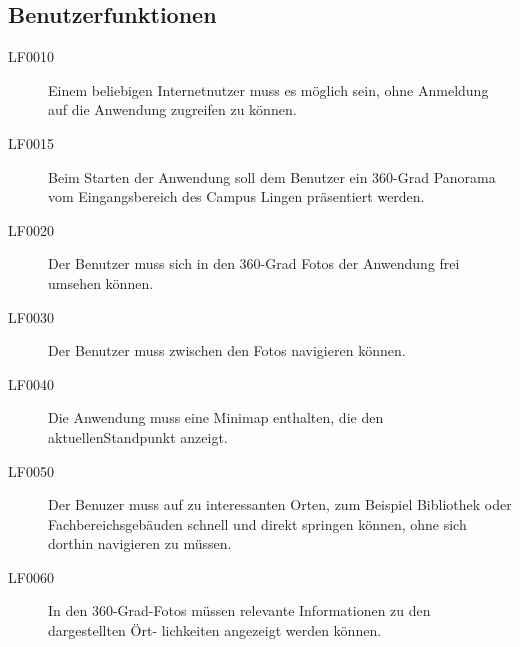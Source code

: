 \subsection{Benutzerfunktionen}
\label{sec:Benutzerfunktionen}

\begin{description}
  \item[LF0010] Einem beliebigen Internetnutzer muss es möglich sein, ohne Anmeldung auf die
  Anwendung zugreifen zu können.
  \item[LF0015] Beim Starten der Anwendung soll dem Benutzer ein 360-Grad Panorama vom
  Eingangsbereich des Campus Lingen präsentiert werden.
  \item[LF0020] Der Benutzer muss sich in den 360-Grad Fotos der Anwendung frei umsehen
  können.
  \item[LF0030] Der Benutzer muss zwischen den Fotos navigieren können.
  \item[LF0040] Die Anwendung muss eine Minimap enthalten, die den aktuellenStandpunkt anzeigt.
  \item[LF0050] Der Benuzer muss auf zu interessanten Orten, zum Beispiel Bibliothek oder Fachbereichsgebäuden schnell und direkt springen können, ohne sich dorthin navigieren zu müssen.
  \item[LF0060] In den 360-Grad-Fotos müssen relevante Informationen zu den dargestellten Ört-
  lichkeiten angezeigt werden können.
\end{description}
